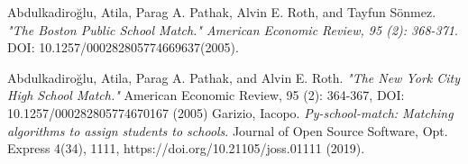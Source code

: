 \documentclass[twocolumn]{bmcart}
\begin{document}
		\begin{backmatter}
			\begin{thebibliography}{9}
				Abdulkadiroğlu, Atila, Parag A. Pathak, Alvin E. Roth, and Tayfun Sönmez.
				\textit{"The Boston Public School Match." American Economic Review, 95 (2): 368-371}. 
				DOI: 10.1257/000282805774669637(2005).
				\vspace{\baselineskip}
				
				Abdulkadiroğlu, Atila, Parag A. Pathak, and Alvin E. Roth.
				\textit{"The New York City High School Match."}
				American Economic Review, {95 (2): 364-367}, DOI: 10.1257/000282805774670167 (2005)
				\vspace{\baselineskip}
				Garizio, Iacopo. 
				\textit{Py-school-match: Matching algorithms to assign students to schools}. 
				Journal of Open Source Software, Opt. Express {4(34)},
				1111, https://doi.org/10.21105/joss.01111 (2019).
				
			\end{thebibliography}
			
			
		\end{backmatter}
	
\end{document}
